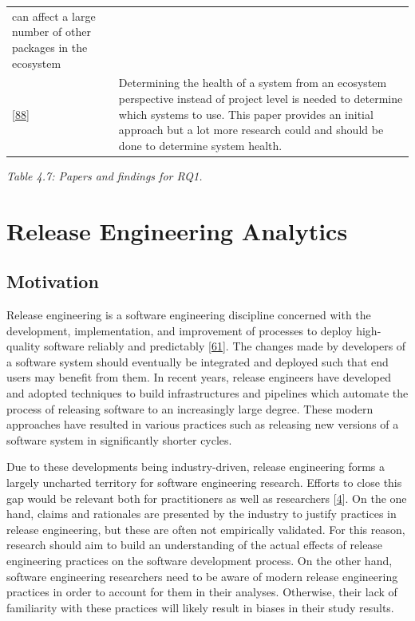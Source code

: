 \documentclass[]{book}
\begin{document}
\begin{longtable}[]{@{}ll@{}}
\begin{minipage}[t]{0.29\columnwidth}
can affect a large number of other packages in the ecosystem\strut
\end{minipage}\tabularnewline
\begin{minipage}[t]{0.13\columnwidth}\raggedright\strut
{[}\protect\hyperlink{ref-Jansen2014}{88}{]}\strut
\end{minipage} & \begin{minipage}[t]{0.29\columnwidth}\raggedright\strut
Determining the health of a system from an ecosystem perspective instead
of project level is needed to determine which systems to use. This paper
provides an initial approach but a lot more research could and should be
done to determine system health.\strut
\end{minipage}\tabularnewline
\bottomrule
\end{longtable}

\emph{Table 4.7: Papers and findings for RQ1.}

\chapter{Release Engineering
Analytics}\label{release-engineering-analytics}

\section{Motivation}\label{motivation-4}

Release engineering is a software engineering discipline concerned with
the development, implementation, and improvement of processes to deploy
high-quality software reliably and predictably
{[}\protect\hyperlink{ref-dyck2015a}{61}{]}. The changes made by
developers of a software system should eventually be integrated and
deployed such that end users may benefit from them. In recent years,
release engineers have developed and adopted techniques to build
infrastructures and pipelines which automate the process of releasing
software to an increasingly large degree. These modern approaches have
resulted in various practices such as releasing new versions of a
software system in significantly shorter cycles.

Due to these developments being industry-driven, release engineering
forms a largely uncharted territory for software engineering research.
Efforts to close this gap would be relevant both for practitioners as
well as researchers {[}\protect\hyperlink{ref-adams2016a}{4}{]}. On the
one hand, claims and rationales are presented by the industry to justify
practices in release engineering, but these are often not empirically
validated. For this reason, research should aim to build an
understanding of the actual effects of release engineering practices on
the software development process. On the other hand, software
engineering researchers need to be aware of modern release engineering
practices in order to account for them in their analyses. Otherwise,
their lack of familiarity with these practices will likely result in
biases in their study results.
\end{document}
